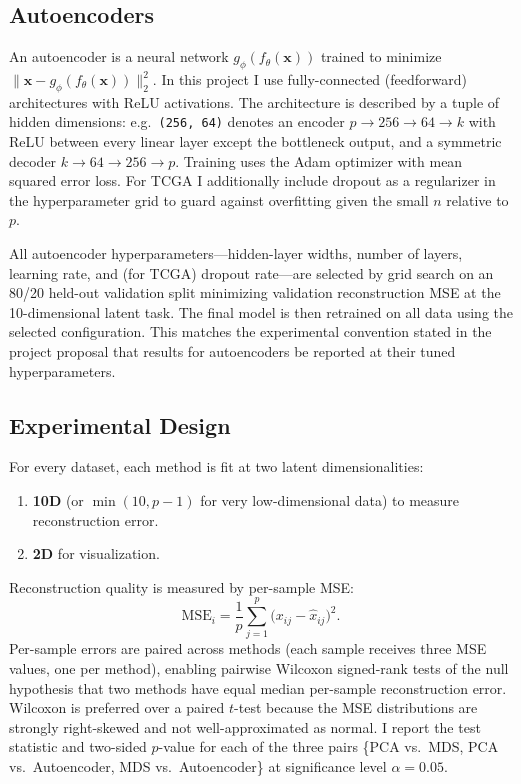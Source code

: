 \documentclass[11pt]{article}
\begin{document}
\subsection{Autoencoders}

An autoencoder is a neural network $g_\phi(f_\theta(\mathbf{x}))$ trained to minimize $\| \mathbf{x} - g_\phi(f_\theta(\mathbf{x})) \|_2^2$. In this project I use fully-connected (feedforward) architectures with ReLU activations. The architecture is described by a tuple of hidden dimensions: e.g.\ \texttt{(256, 64)} denotes an encoder $p \to 256 \to 64 \to k$ with ReLU between every linear layer except the bottleneck output, and a symmetric decoder $k \to 64 \to 256 \to p$. Training uses the Adam optimizer with mean squared error loss. For TCGA I additionally include dropout as a regularizer in the hyperparameter grid to guard against overfitting given the small $n$ relative to $p$.

All autoencoder hyperparameters---hidden-layer widths, number of layers, learning rate, and (for TCGA) dropout rate---are selected by grid search on an 80/20 held-out validation split minimizing validation reconstruction MSE at the 10-dimensional latent task. The final model is then retrained on all data using the selected configuration. This matches the experimental convention stated in the project proposal that results for autoencoders be reported at their tuned hyperparameters.

\subsection{Experimental Design}

For every dataset, each method is fit at two latent dimensionalities:
\begin{enumerate}[noitemsep, topsep=2pt]
  \item \textbf{10D} (or $\min(10, p-1)$ for very low-dimensional data) to measure reconstruction error.
  \item \textbf{2D} for visualization.
\end{enumerate}

Reconstruction quality is measured by per-sample MSE:
\[
\text{MSE}_i = \frac{1}{p} \sum_{j=1}^{p} \bigl( x_{ij} - \widehat{x}_{ij} \bigr)^2.
\]
Per-sample errors are paired across methods (each sample receives three MSE values, one per method), enabling pairwise Wilcoxon signed-rank tests of the null hypothesis that two methods have equal median per-sample reconstruction error. Wilcoxon is preferred over a paired $t$-test because the MSE distributions are strongly right-skewed and not well-approximated as normal. I report the test statistic and two-sided $p$-value for each of the three pairs \{PCA vs.\ MDS, PCA vs.\ Autoencoder, MDS vs.\ Autoencoder\} at significance level $\alpha = 0.05$.
\end{document}
